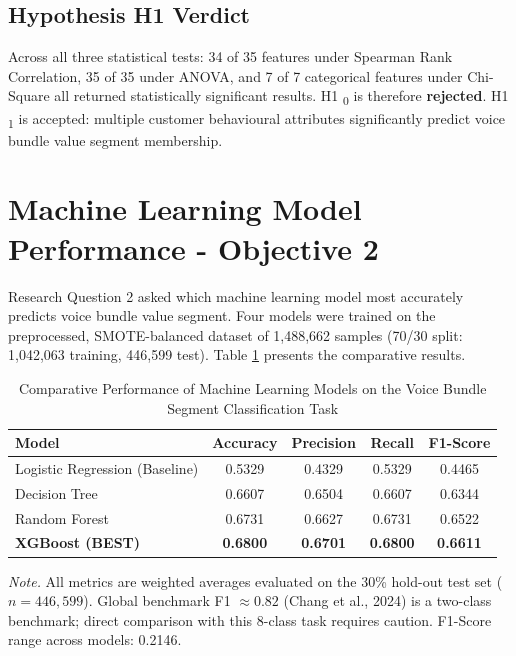 \subsection{Hypothesis H1 Verdict}

Across all three statistical tests: 34 of 35 features under Spearman Rank Correlation, 35 of 35 under ANOVA, and 7 of 7 categorical features under Chi-Square all returned statistically significant results. H1	\textsubscript{0} is therefore \textbf{rejected}. H1	\textsubscript{1} is accepted: multiple customer behavioural attributes significantly predict voice bundle value segment membership.

\section{Machine Learning Model Performance - Objective 2}

Research Question 2 asked which machine learning model most accurately predicts voice bundle value segment. Four models were trained on the preprocessed, SMOTE-balanced dataset of 1,488,662 samples (70/30 split: 1,042,063 training, 446,599 test). Table \ref{tab:models} presents the comparative results.

\begin{table}[H]
\centering
\caption{Comparative Performance of Machine Learning Models on the Voice Bundle Segment Classification Task}
\label{tab:models}
\begin{tabular}{lcccc}
\toprule
\textbf{Model} & \textbf{Accuracy} & \textbf{Precision} & \textbf{Recall} & \textbf{F1-Score} \\
\midrule
Logistic Regression (Baseline) & 0.5329 & 0.4329 & 0.5329 & 0.4465 \\
Decision Tree                  & 0.6607 & 0.6504 & 0.6607 & 0.6344 \\
Random Forest                  & 0.6731 & 0.6627 & 0.6731 & 0.6522 \\
\textbf{XGBoost (BEST)}        & \textbf{0.6800} & \textbf{0.6701} & \textbf{0.6800} & \textbf{0.6611} \\
\bottomrule
\end{tabular}
\begin{flushleft}
\small\textit{Note.} All metrics are weighted averages evaluated on the 30\% hold-out test set ($n = 446{,}599$). Global benchmark F1 $\approx 0.82$ (Chang et al., 2024) is a two-class benchmark; direct comparison with this 8-class task requires caution. F1-Score range across models: 0.2146.
\end{flushleft}
\end{table}


